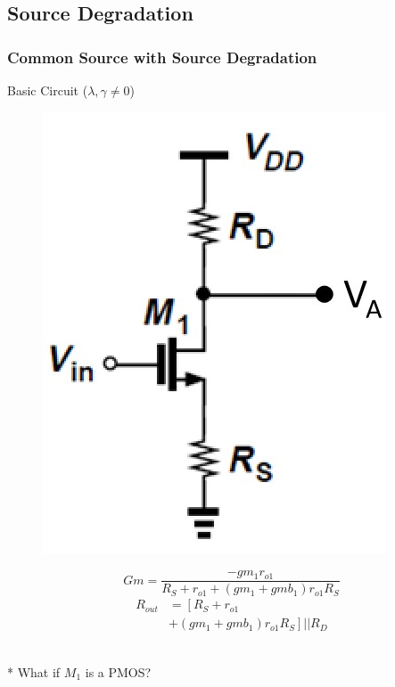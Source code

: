 \documentclass{beamer}
\begin{document}
\subsection{Source Degradation}
\begin{frame}
    \frametitle{Common Source with Source Degradation}
    \begin{minipage}{0.47\linewidth}
        Basic Circuit ($\lambda, \gamma\not=0$)
        \begin{figure}[H]
            \centering
            \includegraphics[width=0.8\linewidth]{degradation.png}
        \end{figure}
    \end{minipage}
    \begin{minipage}{0.51\linewidth}
        \begin{equation*}
            Gm = \frac{-gm_{1} r_{o1}}{R_S+r_{o1}+\left(gm_{1}+gmb_{1}\right) r_{o1} R_{S}} 
        \end{equation*} 
        \begin{equation*}
            \begin{aligned}
                R_{out} &= \left[R_{S}+r_{o1}\right.\\
                &\left.+\left(gm_{1}+gmb_{1}\right) r_{o 1}R_{S}\right] || R_{D}
            \end{aligned}
        \end{equation*}
    \end{minipage}\\
    * What if $M_1$ is a PMOS?  
\end{frame}
\end{document}
